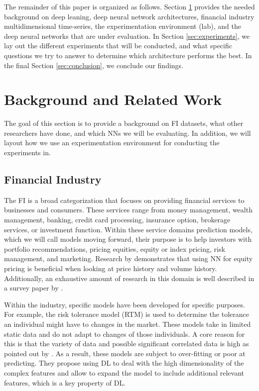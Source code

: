 \documentclass[11pt]{article}
\begin{document}
The remainder of this paper is organized as follows. Section \ref{sec:background} provides the needed background on deep leaning, deep neural network architectures, financial industry multidimensional time-series, the experimentation environment (lab), and the deep neural networks that are under evaluation. In Section \ref{sec:experiments}, we lay out the different experiments that will be conducted, and what specific questions we try to answer to determine which architecture performs the best. In the final Section \ref{sec:conclusion}, we conclude our findings.


\section{Background and Related Work} \label{sec:background}

The goal of this section is to provide a background on FI datasets, what other researchers have done, and which NNs we will be evaluating. In addition, we will layout how we use an experimentation environment for conducting the experiments in.

\subsection{Financial Industry} \label{sec:financial-industry}

The FI is a broad categorization that focuses on providing financial services to businesses and consumers. These services range from money management, wealth management, banking, credit card processing, insurance option, brokerage services, or investment function. Within these service domains prediction models, which we will call models moving forward, their purpose is to help investors with portfolio recommendations, pricing equities, equity or index pricing, risk management, and marketing. Research by \citet{Leigh2002ForecastingSupport} demonstrates that using NN for equity pricing is beneficial when looking at price history and volume history. Additionally, an exhaustive amount of research in this domain is well described in a survey paper by \citet{Bahrammirzaee2010ASystems}.

Within the industry, specific models have been developed for specific purposes. For example, the risk tolerance model (RTM) is used to determine the tolerance an individual might have to changes in the market. These models take in limited static data and do not adapt to changes of those individuals. A core reason for this is that the variety of data and possible significant correlated data is high as pointed out by \citet{Heaton2016DeepFinance}. As a result, these models are subject to over-fitting or poor at predicting. They propose using DL to deal with the high dimensionality of the complex features and allow to expand the model to include additional relevant features, which is a key property of DL.
\end{document}
